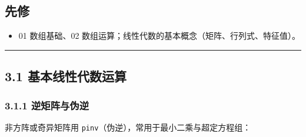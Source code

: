\subsection{先修}\label{ux5148ux4fee-2}

\begin{itemize}
\tightlist
\item
  01 数组基础、02 数组运算；线性代数的基本概念（矩阵、行列式、特征值）。
\end{itemize}

\begin{center}\rule{0.5\linewidth}{0.5pt}\end{center}

\subsection{3.1
基本线性代数运算}\label{ux57faux672cux7ebfux6027ux4ee3ux6570ux8fd0ux7b97}

\subsubsection{3.1.1
逆矩阵与伪逆}\label{ux9006ux77e9ux9635ux4e0eux4f2aux9006}

\begin{Shaded}
\begin{Highlighting}[]
\OperatorTok{=}\OperatorTok{=}\NormalTok{)}

\OperatorTok{=}\NormalTok{ np.array([[}\NormalTok{, }\NormalTok{], [}\NormalTok{, }\NormalTok{]])}
\OperatorTok{=}
\end{Highlighting}
\end{Shaded}

非方阵或奇异矩阵用 \texttt{pinv}（伪逆），常用于最小二乘与超定方程组：

\begin{Shaded}
\begin{Highlighting}[]
\OperatorTok{=}\NormalTok{ np.array([[}\NormalTok{, }\NormalTok{], [}\NormalTok{, }\NormalTok{], [}\NormalTok{, }\NormalTok{]])   }
\end{Highlighting}
\end{Shaded}

